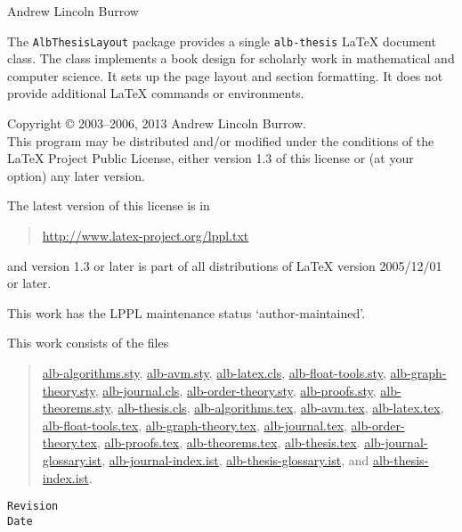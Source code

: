 \documentclass[11pt,a4paper,oneside,titlepage]{alb-latex}
\begin{document}


\begin{albTitlePage}


  Andrew Lincoln Burrow


  The \texttt{AlbThesisLayout} package provides a single
  \texttt{alb-thesis} \LaTeX{} document class.  The class implements a
  book design for scholarly work in mathematical and computer science.
  It sets up the page layout and section formatting.  It does not
  provide additional \LaTeX{} commands or environments.



  Copyright \copyright{} 2003--2006, 2013 Andrew Lincoln Burrow.\\
  This program may be distributed and/or modified under the conditions
  of the \LaTeX{} Project Public License, either version 1.3 of this
  license or (at your option) any later version.

  \medskip{}

  The latest version of this license is in
  \begin{quote}
    \url{http://www.latex-project.org/lppl.txt}
  \end{quote}
  and version 1.3 or later is part of all distributions of LaTeX version
  2005/12/01 or later.

  \medskip{}

  This work has the LPPL maintenance status `author-maintained'.

  \medskip{}

  This work consists of the files
  \begin{quote}
    \begin{flushleft}
      \url{alb-algorithms.sty}, \url{alb-avm.sty}, \url{alb-latex.cls},
      \url{alb-float-tools.sty}, \url{alb-graph-theory.sty},
      \url{alb-journal.cls}, \url{alb-order-theory.sty},
      \url{alb-proofs.sty}, \url{alb-theorems.sty},
      \url{alb-thesis.cls}, \url{alb-algorithms.tex}, \url{alb-avm.tex},
      \url{alb-latex.tex}, \url{alb-float-tools.tex},
      \url{alb-graph-theory.tex}, \url{alb-journal.tex},
      \url{alb-order-theory.tex}, \url{alb-proofs.tex},
      \url{alb-theorems.tex}, \url{alb-thesis.tex}.
      \url{alb-journal-glossary.ist}, \url{alb-journal-index.ist},
      \url{alb-thesis-glossary.ist}, and \url{alb-thesis-index.ist}.
    \end{flushleft}
  \end{quote}



  \verb$Revision$\\
  \verb$Date$

\end{albTitlePage}
\end{document}
